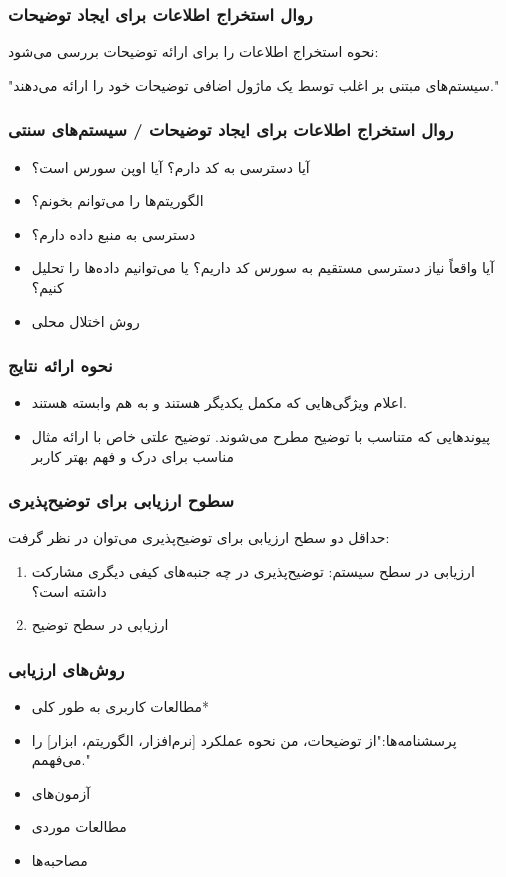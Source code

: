 \documentclass[10pt, a4paper]{beamer}
\begin{document}
\begin{frame}
    \frametitle{روال استخراج اطلاعات برای ایجاد توضیحات}
    نحوه استخراج اطلاعات را برای ارائه توضیحات بررسی می‌شود:

    \centering
    "سیستم‌های مبتنی بر  اغلب توسط یک ماژول اضافی توضیحات خود را ارائه
    می‌دهند."
\end{frame}

\begin{frame}
    \frametitle{روال استخراج اطلاعات برای ایجاد توضیحات / سیستم‌های سنتی}

    \begin{itemize}
        \item آیا دسترسی به کد دارم؟ آیا اوپن سورس است؟
        \item الگوریتم‌ها را می‌توانم بخونم؟
        \item دسترسی به منبع داده دارم؟
        \item آیا واقعاً نیاز دسترسی مستقیم به سورس کد داریم؟ یا می‌توانیم
        داده‌ها را تحلیل کنیم؟
        \item روش اختلال محلی
    \end{itemize}
\end{frame}

\begin{frame}
    \frametitle{نحوه ارائه نتایج}

    \begin{itemize}
        \item اعلام ویژگی‌هایی که مکمل یکدیگر هستند و به هم وابسته هستند.
        \item پیوند‌هایی که متناسب با توضیح مطرح می‌شوند. توضیح علتی خاص با
        ارائه مثال مناسب برای درک و فهم بهتر کاربر
    \end{itemize}
\end{frame}

\begin{frame}
    \frametitle{سطوح ارزیابی برای توضیح‌پذیری}
    حداقل دو سطح ارزیابی برای توضیح‌پذیری می‌توان در نظر گرفت:

    \begin{enumerate}
        \item ارزیابی در سطح سیستم: توضیح‌پذیری در چه جنبه‌های کیفی دیگری مشارکت
        داشته است؟
        \item ارزیابی در سطح توضیح
    \end{enumerate}
\end{frame}

\begin{frame}
    \frametitle{روش‌های ارزیابی}

    \begin{itemize}
        \item مطالعات کاربری به طور کلی*
        \item پرسشنامه‌ها:"از توضیحات، من نحوه عملکرد [نرم‌افزار، الگوریتم،
        ابزار] را می‌فهمم." 
        \item آزمون‌های 
        \item مطالعات موردی
        \item مصاحبه‌ها
    \end{itemize}
\end{frame}
\end{document}
